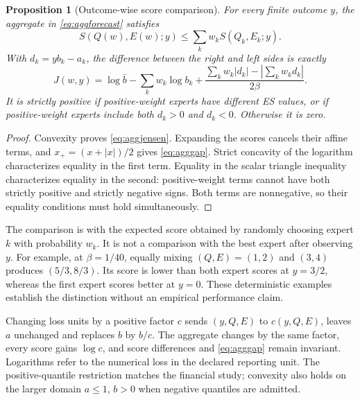 \documentclass[11pt,a4paper]{article}
\newtheorem{proposition}[theorem]{Proposition}
\theoremstyle{definition}\newtheorem{definition}[theorem]{Definition}
\begin{document}
\begin{proposition}[Outcome-wise score comparison]\label{prop:aggjensen}
For every finite outcome $y$, the aggregate in \eqref{eq:aggforecast} satisfies
\begin{equation}
 S(Q(w),E(w);y)\le\sum_k w_kS(Q_k,E_k;y).
 \label{eq:aggjensen}
\end{equation}
With $d_k=yb_k-a_k$, the difference between the right and left sides is exactly
\begin{equation}
 J(w,y)=\log\bar b-\sum_kw_k\log b_k
 +\frac{\sum_kw_k|d_k|-|\sum_kw_kd_k|}{2\beta}.
 \label{eq:agggap}
\end{equation}
It is strictly positive if positive-weight experts have different ES values, or if positive-weight experts include both $d_k>0$ and $d_k<0$. Otherwise it is zero.
\end{proposition}
\begin{proof}
Convexity proves \eqref{eq:aggjensen}. Expanding the scores cancels their affine terms, and $x_+=(x+|x|)/2$ gives \eqref{eq:agggap}. Strict concavity of the logarithm characterizes equality in the first term. Equality in the scalar triangle inequality characterizes equality in the second: positive-weight terms cannot have both strictly positive and strictly negative signs. Both terms are nonnegative, so their equality conditions must hold simultaneously.
\end{proof}
The comparison is with the expected score obtained by randomly choosing expert $k$ with probability $w_k$. It is not a comparison with the best expert after observing $y$. For example, at $\beta=1/40$, equally mixing $(Q,E)=(1,2)$ and $(3,4)$ produces $(5/3,8/3)$. Its score is lower than both expert scores at $y=3/2$, whereas the first expert scores better at $y=0$. These deterministic examples establish the distinction without an empirical performance claim.

Changing loss units by a positive factor $c$ sends $(y,Q,E)$ to $c(y,Q,E)$, leaves $a$ unchanged and replaces $b$ by $b/c$. The aggregate changes by the same factor, every score gains $\log c$, and score differences and \eqref{eq:agggap} remain invariant. Logarithms refer to the numerical loss in the declared reporting unit. The positive-quantile restriction matches the financial study; convexity also holds on the larger domain $a\le1$, $b>0$ when negative quantiles are admitted.
\end{document}
